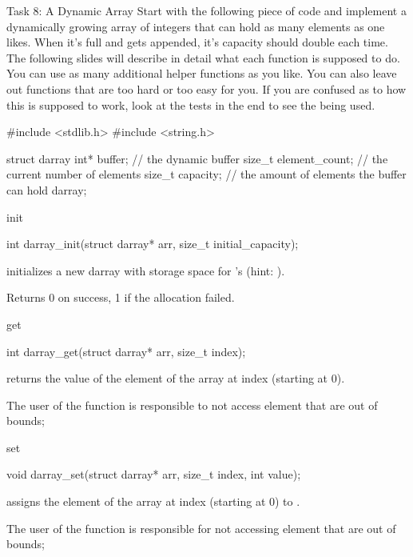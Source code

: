 \documentclass[10pt,graphics,aspectratio=169,table]{beamer}
\begin{document}
\begin{frame}[fragile]{Task 8: A Dynamic Array}
    Start with the following piece of code and implement a dynamically growing
    array of integers that can hold as many elements as one likes.
    When it's full and gets appended, it's capacity should double each time. 
    The following slides will describe in detail what each function is
    supposed to do. You can use as many additional helper functions as you like.
    You can also leave out functions that are too hard or too easy for you.
    If you are confused as to how this is supposed to work, look at the tests
    in the end to see the  being used.
    \begin{codeblock}
#include <stdlib.h>
#include <string.h>

struct darray{
    int* buffer; // the dynamic buffer
    size_t element_count; // the current number of elements 
    size_t capacity; // the amount of elements the buffer can hold
}darray;

    \end{codeblock}
\end{frame}


\begin{frame}[fragile]{init}
    \begin{codeblock}
int darray_init(struct darray* arr, size_t initial_capacity);
    \end{codeblock}

     initializes a new darray 
    with storage space for  's 
    (hint: ).

    Returns 0 on success, 1 if the allocation failed.
\end{frame}

\begin{frame}[fragile]{get}
    \begin{codeblock}
int darray_get(struct darray* arr, size_t index);
    \end{codeblock}

     returns the value of the element of the array
    at index  (starting at 0).

    The user of the function is responsible to not access
    element that are out of bounds;
\end{frame}

\begin{frame}[fragile]{set}
    \begin{codeblock}
void darray_set(struct darray* arr, size_t index, int value);
    \end{codeblock}

     assigns the element of the array at index
     (starting at 0) to .

    The user of the function is responsible for not accessing
    element that are out of bounds;
\end{frame}
\end{document}
